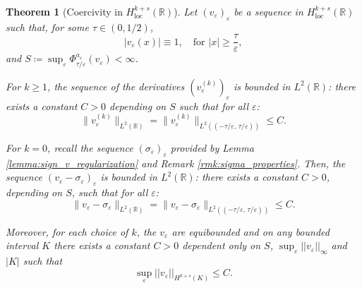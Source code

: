 \documentclass{article}
\newtheorem{Theorem}{Theorem}[section]
\theoremstyle{definition}
\newcommand{\abs}[1]{\left|#1\right|}
\newcommand{\R}{\mathbb{R}}
\newcommand{\e}{\varepsilon}
\def\e{\varepsilon}
\newcommand{\Edo}[1]{{\color{red}#1} }
\begin{document}
\begin{Theorem}[Coercivity in $H^{k+s}_{\operatorname{loc}}(\R)$]
    \label{coercivity}
    Let $(v_\e)_{\e}$ be a sequence in $H^{k+s}_{\operatorname{loc}}(\R)$ such that, for some  $\tau \in (0,1/2)$,
    $$\abs{v_\e (x)} \equiv 1,\quad\text{for } \abs{x}\geq \frac{\tau}{\e},$$
    and $S\coloneqq \sup_\e \Phi^{a_{\scriptstyle\e}}_{\tau/\e}(v_\e)<\infty$. 
    
    For $k \geq 1$, the sequence of the derivatives $(v_\e^{(k)})_{\e}$ is bounded in $L^2(\R)$:
    there exists a constant $C>0$ depending on $S$ such that for all $\e $:
    \begin{equation}
        \label{coerc bound k>0}
        \|v_\e^{(k)}\|_{L^2(\R)}= \|v_\e^{(k)}\|_{L^2((-\tau/\e,\,\tau/\e))}\leq  C.
    \end{equation} 
    
    For $k =0$, recall the sequence $(\sigma_\e)_\e$ provided by Lemma \ref{lemma:sign_v_regularization} and Remark \ref{rmk:sigma_properties}. Then, the sequence $(v_\e-\sigma_\e)_{\e}$ is bounded in $L^2(\R)$:
    there exists a constant $C>0$, depending on $S$, such that for all $\e$:
    \begin{equation}
        \label{coerc bound k=0}
        \|v_\e-\sigma_\e\|_{L^2(\R)} =\|v_\e-\sigma_\e\|_{L^2((-\tau/\e,\,\tau/\e))}\leq C.
    \end{equation}
    
    Moreover, for each choice of $k$, the $v_\e$ are equibounded and on any bounded interval $K$ there exists a constant $C>0$ dependent only on $S$, $\sup_\e ||v_\e||_\infty$ and $|K|$ such that
    \begin{equation}
        \label{bound H^k+s loc}
        \sup_\e ||v_\e||_{H^{k+s}(K)} \leq C.
    \end{equation}
    
\end{Theorem}
\end{document}
